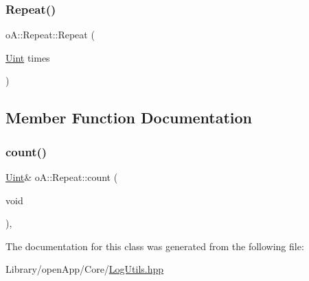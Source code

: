 \subsubsection{\texorpdfstring{Repeat()}{Repeat()}\hspace{0.1cm}{\footnotesize\ttfamily [2/2]}}
{\footnotesize\ttfamily o\+A\+::\+Repeat\+::\+Repeat (\begin{DoxyParamCaption}\item[{\mbox{\hyperlink{namespaceo_a_abe1d8250226c5cf34f84d7b75fc7922e}{Uint}}}]{times }\end{DoxyParamCaption})\hspace{0.3cm}{\ttfamily [inline]}}



\subsection{Member Function Documentation}
\mbox{\label{classo_a_1_1_repeat_aae1cd1f736329d24bebd70a050aec29c}} 
\subsubsection{\texorpdfstring{count()}{count()}}
{\footnotesize\ttfamily \mbox{\hyperlink{namespaceo_a_abe1d8250226c5cf34f84d7b75fc7922e}{Uint}}\& o\+A\+::\+Repeat\+::count (\begin{DoxyParamCaption}\item[{void}]{ }\end{DoxyParamCaption})\hspace{0.3cm}{\ttfamily [inline]}, {\ttfamily [noexcept]}}



The documentation for this class was generated from the following file\+:\begin{DoxyCompactItemize}
\item 
Library/open\+App/\+Core/\mbox{\hyperlink{_log_utils_8hpp}{Log\+Utils.\+hpp}}\end{DoxyCompactItemize}
